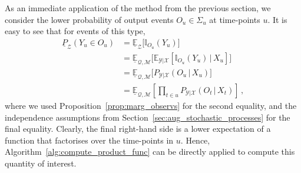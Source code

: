 \documentclass[3p]{elsarticle}
\newcommand{\states}{\mathcal{X}}
\newcommand{\observs}{\mathcal{Y}}
\newcommand{\rateset}{\mathcal{Q}}
\begin{document}
As an immediate application of the method from the previous section, we consider the lower probability of output events $O_u\in\Sigma_u$ at time-points $u$. It is easy to see that for events of this type,
\begin{align*}
\underline{P}_\mathcal{Z}(Y_u\in O_u) &= \underline{\mathbb{E}}_\mathcal{Z}\bigl[\mathbb{I}_{O_u}(Y_u)\bigr] \\
 &= \underline{\mathbb{E}}_{\rateset,\mathcal{M}}\bigl[\mathbb{E}_{\observs\vert\states}[\mathbb{I}_{O_u}(Y_u)\,\vert\,X_u]\bigr] \\
 &= \underline{\mathbb{E}}_{\rateset,\mathcal{M}}\bigl[P_{\observs\vert\states}(O_u\,\vert\,X_u)\bigr] \\
& = \underline{\mathbb{E}}_{\mathcal{Q},\mathcal{M}}\left[\prod_{t\in u}P_{\observs\vert\states}(O_t\,\vert\,X_t)\right]\,,
\end{align*}
where we used Proposition~\ref{prop:marg_observs} for the second equality, and the independence assumptions from Section~\ref{sec:aug_stochastic_processes} for the final equality. Clearly, the final right-hand side is a lower expectation of a function that factorises over the time-points in $u$. Hence, Algorithm~\ref{alg:compute_product_func} can be directly applied to compute this quantity of interest. 
\end{document}
